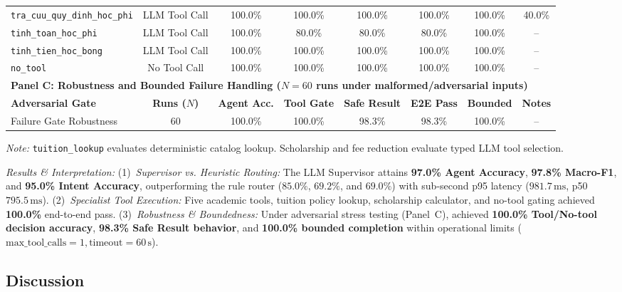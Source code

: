 \begin{table}[!htbp]
{\begin{tabular}{lccccccc}
\texttt{tra\_cuu\_quy\_dinh\_hoc\_phi} & LLM Tool Call & 100.0\% & 100.0\% & 100.0\% & 100.0\% & 100.0\% & 40.0\% \\
\texttt{tinh\_toan\_hoc\_phi} & LLM Tool Call & 100.0\% & 80.0\% & 80.0\% & 80.0\% & 100.0\% & -- \\
\texttt{tinh\_tien\_hoc\_bong} & LLM Tool Call & 100.0\% & 100.0\% & 100.0\% & 100.0\% & 100.0\% & -- \\
\texttt{no\_tool} & No Tool Call & 100.0\% & 100.0\% & 100.0\% & 100.0\% & 100.0\% & -- \\
\midrule
\multicolumn{8}{l}{\textbf{Panel C: Robustness and Bounded Failure Handling ($N=60$ runs under malformed/adversarial inputs)}} \\
\midrule
\textbf{Adversarial Gate} & \textbf{Runs ($N$)} & \textbf{Agent Acc.} & \textbf{Tool Gate} & \textbf{Safe Result} & \textbf{E2E Pass} & \textbf{Bounded} & \textbf{Notes} \\
\midrule
Failure Gate Robustness    & 60 & 100.0\% & 100.0\% & 98.3\% & 98.3\% & 100.0\% & -- \\
\bottomrule
\end{tabular}
}
\smallskip
\parbox{\columnwidth}{\footnotesize\emph{Note:} \texttt{tuition\_lookup} evaluates deterministic catalog lookup. Scholarship and fee reduction evaluate typed LLM tool selection.}
\end{table}

\emph{Results \& Interpretation:}
(1)~\emph{Supervisor vs. Heuristic Routing:} The LLM Supervisor attains \textbf{97.0\% Agent Accuracy}, \textbf{97.8\% Macro-F1}, and \textbf{95.0\% Intent Accuracy}, outperforming the rule router ($85.0\%$, $69.2\%$, and $69.0\%$) with sub-second p95 latency ($981.7\,\text{ms}$, p50 $795.5\,\text{ms}$).
(2)~\emph{Specialist Tool Execution:} Five academic tools, tuition policy lookup, scholarship calculator, and no-tool gating achieved \textbf{100.0\%} end-to-end pass.
(3)~\emph{Robustness \& Boundedness:} Under adversarial stress testing (Panel~C), \system{} achieved \textbf{100.0\% Tool/No-tool decision accuracy}, \textbf{98.3\% Safe Result behavior}, and \textbf{100.0\% bounded completion} within operational limits ($\text{max\_tool\_calls}=1, \text{timeout}=60\,\text{s}$).

\subsection{Discussion}
\label{sec:discussion}

